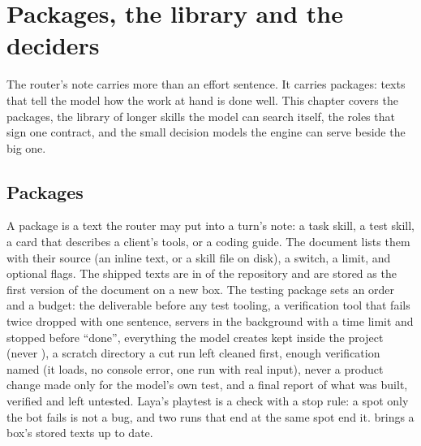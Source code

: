 \chapter{Packages, the library and the deciders}\label{ch:packages}

The router's note carries more than an effort sentence. It carries packages: texts that tell the model how the work at hand is done well. This chapter covers the packages, the library of longer skills the model can search itself, the roles that sign one contract, and the small decision models the engine can serve beside the big one.

\section{Packages}

A package is a text the router may put into a turn's note: a task skill, a test skill, a card that describes a client's tools, or a coding guide. The  document lists them with their source (an inline text, or a skill file on disk), a switch, a  limit, and optional flags. The shipped texts are in  of the repository and are stored as the first version of the document on a new box. The testing package sets an order and a budget: the deliverable before any test tooling, a verification tool that fails twice dropped with one sentence, servers in the background with a time limit and stopped before ``done'', everything the model creates kept inside the project (never ), a scratch directory a cut run left cleaned first, enough verification named (it loads, no console error, one run with real input), never a product change made only for the model's own test, and a final report of what was built, verified and left untested. Laya's playtest is a check with a stop rule: a spot only the bot fails is not a bug, and two runs that end at the same spot end it.  brings a box's stored texts up to date.

